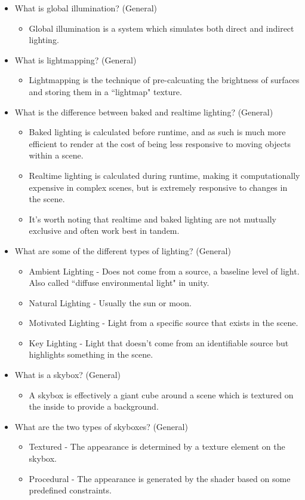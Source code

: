 \documentclass{article}
\begin{document}
\begin{itemize}
\begin{itemize}
    \end{itemize}
    \item What is global illumination? (General)
    \begin{itemize}
        \item Global illumination is a system which simulates both direct and indirect lighting.
    \end{itemize}
     \item What is lightmapping? (General)
    \begin{itemize}
        \item Lightmapping is the technique of pre-calcuating the brightness of surfaces and storing them in a ``lightmap" texture.
    \end{itemize}
     \item What is the difference between baked and realtime lighting? (General)
    \begin{itemize}
        \item Baked lighting is calculated before runtime, and as such is much more efficient to render at the cost of being less responsive to moving objects within a scene.
        \item Realtime lighting is calculated during runtime, making it computationally expensive in complex scenes, but is extremely responsive to changes in the scene.
        \item It's worth noting that realtime and baked lighting are not mutually exclusive and often work best in tandem.
    \end{itemize}
    \item What are some of the different types of lighting? (General)
    \begin{itemize}
        \item Ambient Lighting - Does not come from a source, a baseline level of light. Also called ``diffuse environmental light" in unity.
        \item Natural Lighting - Usually the sun or moon.
        \item Motivated Lighting - Light from a specific source that exists in the scene.
        \item Key Lighting - Light that doesn't come from an identifiable source but highlights something in the scene.
    \end{itemize}
    \item What is a skybox? (General)
    \begin{itemize}
        \item A skybox is effectively a giant cube around a scene which is textured on the inside to provide a background.
    \end{itemize}
    \item What are the two types of skyboxes? (General)
    \begin{itemize}
        \item Textured - The appearance is determined by a texture element on the skybox.
        \item Procedural - The appearance is generated by the shader based on some predefined constraints.
    \end{itemize}
\end{itemize}
\end{document}
